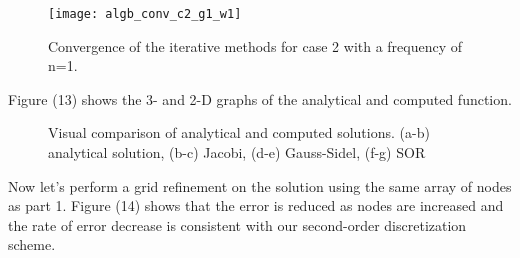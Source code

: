 \documentclass{article}
\begin{document}
\begin{figure}[H]
\centering
\texttt{[image: algb\_conv\_c2\_g1\_w1]}\label{Algebraic Convergence}
\caption{Convergence of the iterative methods for case 2 with a frequency of n=1. }
\end{figure}

\vspace{1em}

\noindent Figure (13) shows the 3- and 2-D graphs of the analytical and computed function.

\begin{figure}[H]
\centering
\subfigure[]{\texttt{[image: p\_an2\_3d]}\label{analytical function 3D}}
\subfigure[]{\texttt{[image: p\_an2\_2d]}\label{analytical function 2D}}
\caption{Visual comparison of analytical and computed solutions. (a-b) analytical solution, (b-c) Jacobi, (d-e) Gauss-Sidel, (f-g) SOR }
\end{figure}

\noindent Now let's perform a grid refinement on the solution using the same array of nodes as part 1. Figure (14) shows that the error is reduced as nodes are increased and the rate of error decrease is consistent with our second-order discretization scheme.
\end{document}
